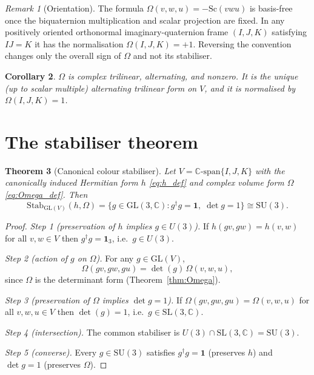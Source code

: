 \documentclass[12pt,a4paper]{article}
\newtheorem{theorem}{Theorem}[section]
\newtheorem{corollary}[theorem]{Corollary}
\theoremstyle{definition}
\theoremstyle{remark}
\newtheorem{remark}[theorem]{Remark}
\begin{document}
\begin{remark}[Orientation]\label{rem:orientation}
The formula $\Omega(v,w,u)=-\mathrm{Sc}(vwu)$ is basis-free once the
biquaternion multiplication and scalar projection are fixed.  In any positively
oriented orthonormal imaginary-quaternion frame $(I,J,K)$ satisfying $IJ=K$ it
has the normalisation $\Omega(I,J,K)=+1$.  Reversing the convention changes only
the overall sign of $\Omega$ and not its stabiliser.
\end{remark}

\begin{corollary}
$\Omega$ is complex trilinear, alternating, and nonzero.  It is the unique
(up to scalar multiple) alternating trilinear form on $V$, and it is normalised
by $\Omega(I,J,K)=1$.
\end{corollary}

\section{The stabiliser theorem}
\label{sec:stabiliser}

\begin{theorem}[Canonical colour stabiliser]\label{thm:SU3}
Let $V = \mathbb{C}\text{-span}\{I,J,K\}$ with the canonically induced
Hermitian form $h$ \eqref{eq:h_def} and complex volume form $\Omega$
\eqref{eq:Omega_def}.  Then
\begin{equation}
  \mathrm{Stab}_{\mathrm{GL}(V)}(h,\Omega)
  = \{g\in\mathrm{GL}(3,\mathbb{C}) : g^\dagger g = \mathbf{1},\;\det g = 1\}
  \cong \mathrm{SU}(3).
\end{equation}
\end{theorem}

\begin{proof}
\emph{Step 1 (preservation of $h$ implies $g\in U(3)$).}
If $h(gv,gw)=h(v,w)$ for all $v,w\in V$ then $g^\dagger g = \mathbf{1}_3$,
i.e.\ $g\in U(3)$.

\emph{Step 2 (action of $g$ on $\Omega$).}
For any $g\in\mathrm{GL}(V)$,
\begin{equation}
  \Omega(gv,gw,gu) = \det(g)\,\Omega(v,w,u),
\end{equation}
since $\Omega$ is the determinant form (Theorem~\ref{thm:Omega}).

\emph{Step 3 (preservation of $\Omega$ implies $\det g = 1$).}
If $\Omega(gv,gw,gu)=\Omega(v,w,u)$ for all $v,w,u\in V$ then
$\det(g)=1$, i.e.\ $g\in\mathrm{SL}(3,\mathbb{C})$.

\emph{Step 4 (intersection).}
The common stabiliser is $U(3)\cap\mathrm{SL}(3,\mathbb{C}) = \mathrm{SU}(3)$.

\emph{Step 5 (converse).}
Every $g\in\mathrm{SU}(3)$ satisfies $g^\dagger g=\mathbf{1}$ (preserves $h$)
and $\det g=1$ (preserves $\Omega$).
\end{proof}
\end{document}
